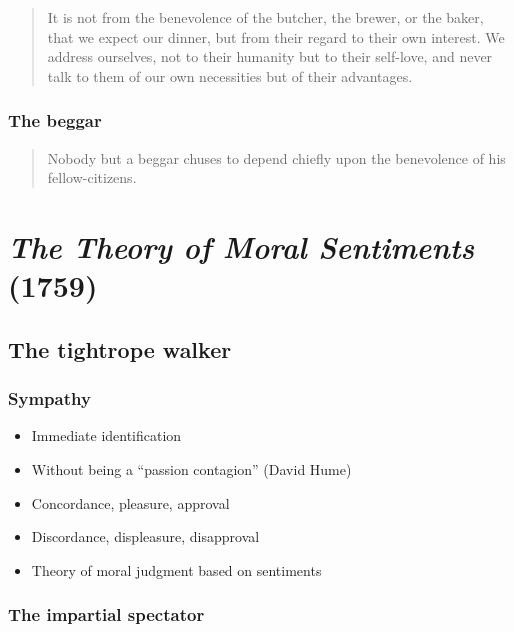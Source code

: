             \begin{quote}
                It is not from the benevolence of the butcher, the brewer, or the baker, that we expect our dinner, but from their regard to their own interest. We address ourselves, not to their humanity but to their self-love, and never talk to them of our own necessities but of their advantages.
            \end{quote}

        \subsubsection{The beggar}

            \begin{quote}
                Nobody but a beggar chuses to depend chiefly upon the benevolence of his fellow-citizens.
            \end{quote}

\section{\textit{The Theory of Moral Sentiments} (1759)}

    \subsection{The tightrope walker}

        \subsubsection{Sympathy}

            \begin{itemize}
                \item Immediate identification
                \item Without being a “passion contagion” (David Hume)
                \item Concordance, pleasure, approval
                \item Discordance, displeasure, disapproval
                \item Theory of moral judgment based on sentiments
            \end{itemize}

        \subsubsection{The impartial spectator}

